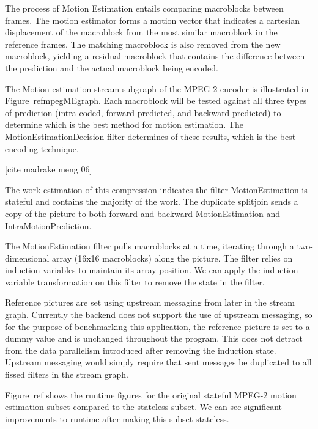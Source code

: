 The process of Motion Estimation entails comparing macroblocks between frames.  The motion estimator forms a motion vector that indicates a cartesian displacement of the macroblock from the most similar macroblock in the reference frames.  The matching macroblock is also removed from the new macroblock, yielding a residual macroblock that contains the difference between the prediction and the actual macroblock being encoded.  

The Motion estimation stream subgraph of the MPEG-2 encoder is illustrated in Figure~ref{mpegMEgraph}.  Each macroblock will be tested against all three types of prediction (intra coded, forward predicted, and backward predicted) to determine which is the best method for motion estimation.  The MotionEstimationDecision filter determines of these results, which is the best encoding technique.

[cite madrake meng 06]

The work estimation of this compression indicates the filter MotionEstimation is stateful and contains the majority of the work.  The duplicate splitjoin sends a copy of the picture to both forward and backward MotionEstimation and IntraMotionPrediction.  

The MotionEstimation filter pulls macroblocks at a time, iterating through a two-dimensional array (16x16 macroblocks) along the picture.  The filter relies on induction variables to maintain its array position.  We can apply the induction variable transformation on this filter to remove the state in the filter.

Reference pictures are set using upstream messaging from later in the stream graph.  Currently the backend does not support the use of upstream messaging, so for the purpose of benchmarking this application, the reference picture is set to a dummy value and is unchanged throughout the program.  This does not detract from the data parallelism introduced after removing the induction state.  Upstream messaging would simply require that sent messages be duplicated to all fissed filters in the stream graph.

Figure~ref{} shows the runtime figures for the original stateful MPEG-2 motion estimation subset compared to the stateless subset.  We can see significant improvements to runtime after making this subset stateless.  